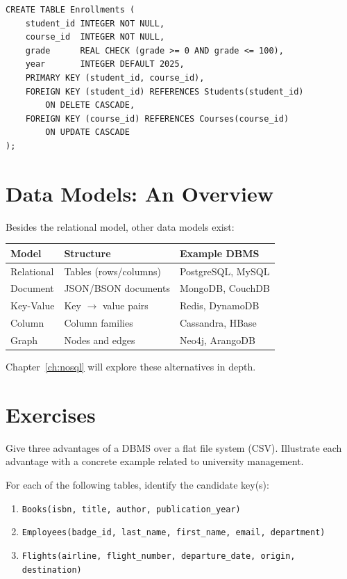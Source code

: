 \begin{codeblock}[title=\textbf{Complete Constraint Example}]
\begin{verbatim}
CREATE TABLE Enrollments (
    student_id INTEGER NOT NULL,
    course_id  INTEGER NOT NULL,
    grade      REAL CHECK (grade >= 0 AND grade <= 100),
    year       INTEGER DEFAULT 2025,
    PRIMARY KEY (student_id, course_id),
    FOREIGN KEY (student_id) REFERENCES Students(student_id)
        ON DELETE CASCADE,
    FOREIGN KEY (course_id) REFERENCES Courses(course_id)
        ON UPDATE CASCADE
);
\end{verbatim}
\end{codeblock}

\section{Data Models: An Overview}

Besides the relational model, other data models exist:

\begin{center}
\begin{tabular}{lll}
\toprule
\textbf{Model} & \textbf{Structure} & \textbf{Example DBMS} \\
\midrule
Relational & Tables (rows/columns) & PostgreSQL, MySQL \\
Document & JSON/BSON documents & MongoDB, CouchDB \\
Key-Value & Key $\to$ value pairs & Redis, DynamoDB \\
Column & Column families & Cassandra, HBase \\
Graph & Nodes and edges & Neo4j, ArangoDB \\
\bottomrule
\end{tabular}
\end{center}

Chapter~\ref{ch:nosql} will explore these alternatives in depth.

\section*{Exercises}

\begin{exercise}
Give three advantages of a DBMS over a flat file system (CSV).
Illustrate each advantage with a concrete example related to university
management.
\end{exercise}

\begin{exercise}
For each of the following tables, identify the candidate key(s):
\begin{enumerate}
    \item \texttt{Books(isbn, title, author, publication\_year)}
    \item \texttt{Employees(badge\_id, last\_name, first\_name, email, department)}
    \item \texttt{Flights(airline, flight\_number, departure\_date, origin, destination)}
\end{enumerate}
\end{exercise}

